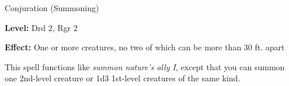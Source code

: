 
Conjuration (Summoning)

\textbf{Level:} Drd 2, Rgr 2

\textbf{Effect:} One or more creatures, no two of which can be more than 30 ft. 
apart

This spell functions like \textit{summon nature's ally I}, except that you can 
summon one 2nd-level creature or 1d3 1st-level creatures of the same kind.

